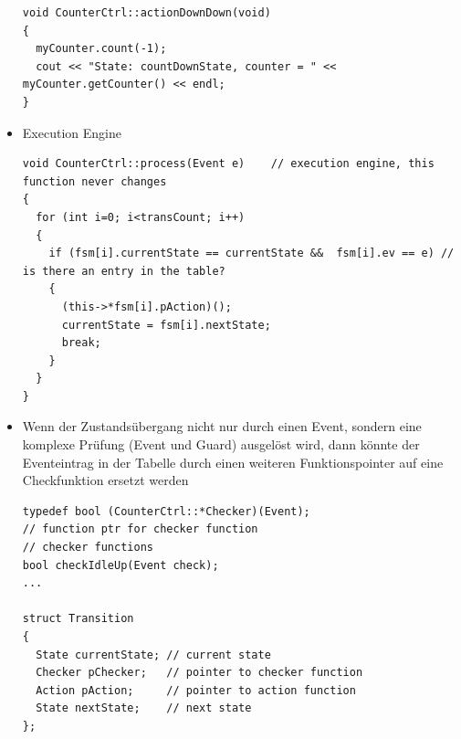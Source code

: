 \begin{itemize}
\begin{lstlisting}[style=Cpp]
void CounterCtrl::actionDownDown(void)
{
  myCounter.count(-1);
  cout << "State: countDownState, counter = " << myCounter.getCounter() << endl;
}
\end{lstlisting}
\item Execution Engine
\begin{lstlisting}[style=Cpp]
void CounterCtrl::process(Event e)    // execution engine, this function never changes
{
  for (int i=0; i<transCount; i++)
  {
    if (fsm[i].currentState == currentState &&  fsm[i].ev == e) // is there an entry in the table?
    {
      (this->*fsm[i].pAction)();
      currentState = fsm[i].nextState;
      break;
    }
  }
}
\end{lstlisting}
\item Wenn der Zustandsübergang nicht nur durch einen Event, sondern eine
komplexe Prüfung (Event und Guard) ausgelöst wird, dann könnte der Eventeintrag
in der Tabelle durch einen weiteren Funktionspointer auf eine Checkfunktion
ersetzt werden
\begin{lstlisting}[style=Cpp]
typedef bool (CounterCtrl::*Checker)(Event);
// function ptr for checker function 
// checker functions
bool checkIdleUp(Event check); 
...

struct Transition 
{
  State currentState; // current state
  Checker pChecker;   // pointer to checker function
  Action pAction;     // pointer to action function
  State nextState;    // next state
};
\end{lstlisting}
\end{itemize}

